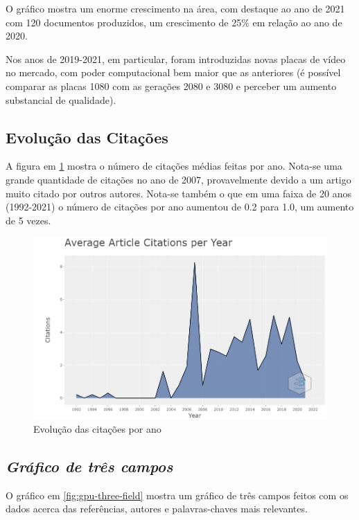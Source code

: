 O gráfico mostra um enorme crescimento na área, com destaque ao ano de 2021 com 120 documentos produzidos, um crescimento de 25\% em relação ao ano de 2020.

Nos anos de 2019-2021, em particular, foram introduzidas novas placas de vídeo no mercado, com poder computacional bem maior que as anteriores (é possível comparar as placas 1080 com as gerações 2080 e 3080 e perceber um aumento substancial de qualidade).

\subsection{Evolução das Citações}

A figura em \ref{fig:gpu-citation-year} mostra o número de citações médias feitas por ano. Nota-se uma grande quantidade de citações no ano de 2007, provavelmente devido a um artigo muito citado por outros autores. Nota-se também o que em uma faixa de 20 anos (1992-2021) o número de citações por ano aumentou de 0.2 para 1.0, um aumento de 5 vezes.

\begin{figure}[ht]
    \centering
    \includegraphics[width=12cm]{experiments/gustavo-tomas/AnaliseBibliometrica/GPUs/Graficos/gpu-citation-year.png}
    \caption{Evolução das citações por ano}
    \label{fig:gpu-citation-year}
\end{figure}

\subsection{\textit{Gráfico de três campos}}

O gráfico em \ref{fig:gpu-three-field} mostra um gráfico de três campos feitos com os dados acerca das referências, autores e palavras-chaves mais relevantes.

